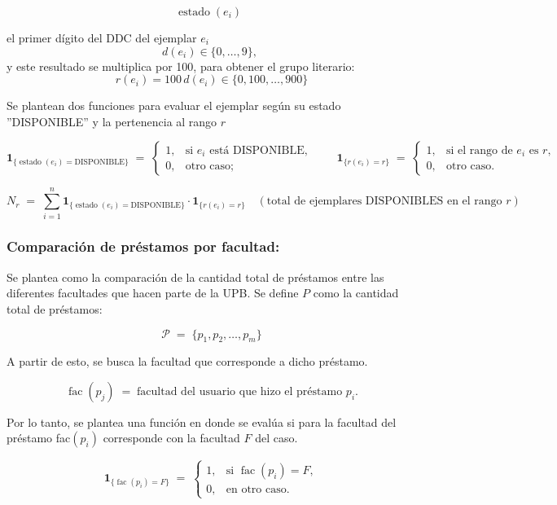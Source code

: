\documentclass[spanish]{ieee_upb}
\begin{document}
\[
  \operatorname{estado}(e_i)\; \; 
  \]

el primer dígito del DDC del ejemplar \(e_i\)
  \[
  d(e_i)\in\{0,\dots,9\},\; 
\]
  y este resultado se multiplica por 100, para obtener el grupo literario:
  \[
  r(e_i)=100\,d(e_i)\in\{0,100,\dots,900\}
  \]

Se plantean dos funciones para evaluar el ejemplar según su estado ''DISPONIBLE'' y la pertenencia al rango \(r\)

\[
  \mathbf 1_{\{\operatorname{estado}(e_i)=\text{DISPONIBLE}\}}
  \;=\;
  \begin{cases}
    1, & \text{si }e_i\text{ está DISPONIBLE},\\
    0, & \text{otro caso;}
  \end{cases}
\qquad
  \mathbf 1_{\{r(e_i)=r\}}
  \;=\;
  \begin{cases}
    1, & \text{si el rango de }e_i\text{ es }r,\\
    0, & \text{otro caso.}
  \end{cases}
\]

\[
  N_r
  \;=\;
  \sum_{i=1}^{n}
    \mathbf 1_{\{\operatorname{estado}(e_i)=\text{DISPONIBLE}\}}
    \cdot
    \mathbf 1_{\{r(e_i)=r\}}
  \quad
  \left(\text{total de ejemplares DISPONIBLES en el rango }r\right)
\]





\subsubsection{Comparación de préstamos por facultad:}
Se plantea como la comparación de la cantidad total de préstamos entre las diferentes facultades que hacen parte de la UPB. Se define \(P\) como la cantidad total de préstamos:

\[
  \mathcal{P}\;=\;\{
      p_1,p_2,\dots,p_m
  \}
\]

A partir de esto, se busca la facultad que corresponde a dicho préstamo. 

\[
  \operatorname{fac}(p_j)\;=\;\text{facultad del usuario que hizo el préstamo }p_i.
\]

Por lo tanto, se plantea una función en donde se evalúa si para la facultad del préstamo fac\((p_i)\) corresponde con la facultad \(F\) del caso. 

\[
  \mathbf 1_{\{\operatorname{fac}(p_i)=F\}}
  \;=\;
  \begin{cases}
    1, & \text{si } \operatorname{fac}(p_i)=F,\\[4pt]
    0, & \text{en otro caso.}
  \end{cases}
\]
\end{document}
